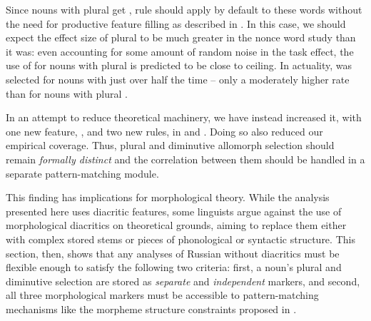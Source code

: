 \documentclass[output=paper,colorlinks,citecolor=brown
]{langscibook}
\begin{document}

Since nouns with plural \pla{} get , rule  should apply by default to these words without the need for productive feature filling as described in . In this case, we should expect the effect size of plural \pla{} to be much greater in the nonce word study than it was: even accounting for some amount of random noise in the task effect, the use of \ok{} for nouns with plural \pla{} is predicted to be close to ceiling. In actuality, \ok{} was selected for nouns with \pla{} just over half the time -- only a moderately higher rate than for nouns with plural \pli.


In an attempt to reduce theoretical machinery, we have instead increased it, with one new feature, , and two new rules, in  and . Doing so also reduced our empirical coverage. Thus, plural and diminutive allomorph selection should remain \emph{formally distinct} and the correlation between them should be handled in a separate pattern-matching module.

This finding has implications for morphological theory. While the analysis presented here uses diacritic features, some linguists argue against the use of morphological diacritics on theoretical grounds, aiming to replace them either with complex stored stems \citep[e.g.][]{BermudezOtero2013} or pieces of phonological \citep[e.g.][]{Lampitelli.Ulfsbjorninn2023} or syntactic \citep[e.g.][]{Caha2021} structure. This section, then, shows that any analyses of Russian without diacritics must be flexible enough to satisfy the following two criteria: first, a noun's plural and diminutive selection are stored as \emph{separate} and \emph{independent} markers, and second, all three morphological markers must be accessible to pattern-matching mechanisms like the morpheme structure constraints proposed in .
\end{document}

